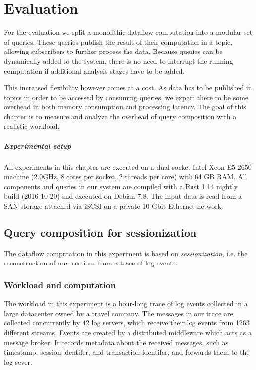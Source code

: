 \chapter{Evaluation}\label{ch:evaluation}

For the evaluation we split a monolithic dataflow computation into a
modular set of queries. These queries publish the result of their computation
in a topic, allowing subscribers to further process the data. Because queries
can be dynamically added to the system, there is no need to interrupt the
running computation if additional analysis stages have to be added.

This increased flexibility however comes at a cost. As data has to be published
in topics in order to be accessed by consuming queries, we expect there to be
some overhead in both memory consumption and processing latency. The goal
of this chapter is to measure and analyze the overhead of query composition
with a realistic workload.

\paragraph{Experimental setup}

All experiments in this chapter are executed on a dual-socket Intel Xeon E5-2650
machine (2.0GHz, 8 cores per socket, 2 threads per core) with 64 GB RAM. All components and
queries in our system are compiled with a Rust 1.14 nightly build (2016-10-20)
and executed on Debian 7.8. The input data is read from a SAN storage attached
via iSCSI on a private 10 Gbit Ethernet network.

\section{Query composition for sessionization}

The dataflow computation in this experiment is based on \emph{sessionization},
i.e. the reconstruction of user sessions from a trace of log events.

\subsection{Workload and computation}

The workload in this experiment is a hour-long trace of log events collected in
a large datacenter owned by a travel company. The messages in our trace are
collected concurrently by 42 log servers, which receive their log events from
1263 different streams. Events are created by a distributed middleware which acts
as a message broker. It records metadata about the received messages, such as
timestamp, session identifer, and transaction identifer, and forwards them to
the log sever.

